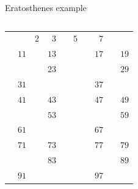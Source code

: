 \documentclass{beamer}
\begin{document}
\begin{frame}[plain]{Eratosthenes example}
{\begin{tabular}{r r r r r r r r r r}
        \end{tabular}
	}
	 {
		\begin{tabular}{r r r r r r r r r r}
			                   &                    & \color{black}  $2$ & \color{black}  $3$ &                    & \color{black}  $5$ &                    & \color{ blue}  $7$ &                    &                   \\
			                   & \color{black} $11$ &                    & \color{black} $13$ &                    &                    &                    & \color{black} $17$ &                    & \color{black} $19$\\
			                   &                    &                    & \color{black} $23$ &                    &                    &                    &                    &                    & \color{black} $29$\\
			                   & \color{black} $31$ &                    &                    &                    &                    &                    & \color{black} $37$ &                    &                   \\
			                   & \color{black} $41$ &                    & \color{black} $43$ &                    &                    &                    & \color{black} $47$ &                    & \color{black} $49$\\
			                   &                    &                    & \color{black} $53$ &                    &                    &                    &                    &                    & \color{black} $59$\\
			                   & \color{black} $61$ &                    &                    &                    &                    &                    & \color{black} $67$ &                    &                   \\
			                   & \color{black} $71$ &                    & \color{black} $73$ &                    &                    &                    & \color{black} $77$ &                    & \color{black} $79$\\
			                   &                    &                    & \color{black} $83$ &                    &                    &                    &                    &                    & \color{black} $89$\\
			                   & \color{black} $91$ &                    &                    &                    &                    &                    & \color{black} $97$ &                    &                   \\

\end{tabular}}
\end{frame}
\end{document}
